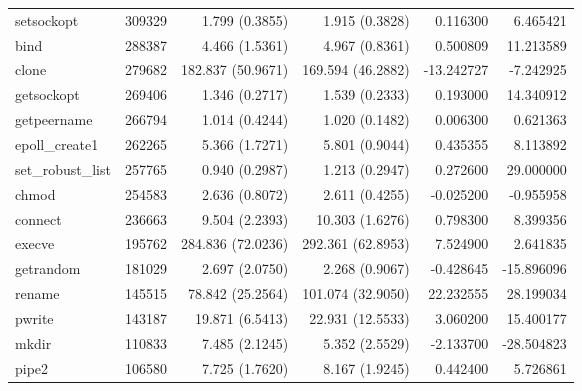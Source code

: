 \begin{longtable}{>{\ttfamily}lrrrrr}
                     setsockopt &      309329 &           1.799 (0.3855) &           1.915 (0.3828) &        0.116300 &     6.465421 \\
                           bind &      288387 &           4.466 (1.5361) &           4.967 (0.8361) &        0.500809 &    11.213589 \\
                          clone &      279682 &        182.837 (50.9671) &        169.594 (46.2882) &      -13.242727 &    -7.242925 \\
                     getsockopt &      269406 &           1.346 (0.2717) &           1.539 (0.2333) &        0.193000 &    14.340912 \\
                    getpeername &      266794 &           1.014 (0.4244) &           1.020 (0.1482) &        0.006300 &     0.621363 \\
                 epoll\_create1 &      262265 &           5.366 (1.7271) &           5.801 (0.9044) &        0.435355 &     8.113892 \\
              set\_robust\_list &      257765 &           0.940 (0.2987) &           1.213 (0.2947) &        0.272600 &    29.000000 \\
                          chmod &      254583 &           2.636 (0.8072) &           2.611 (0.4255) &       -0.025200 &    -0.955958 \\
                        connect &      236663 &           9.504 (2.2393) &          10.303 (1.6276) &        0.798300 &     8.399356 \\
                         execve &      195762 &        284.836 (72.0236) &        292.361 (62.8953) &        7.524900 &     2.641835 \\
                      getrandom &      181029 &           2.697 (2.0750) &           2.268 (0.9067) &       -0.428645 &   -15.896096 \\
                         rename &      145515 &         78.842 (25.2564) &        101.074 (32.9050) &       22.232555 &    28.199034 \\
                         pwrite &      143187 &          19.871 (6.5413) &         22.931 (12.5533) &        3.060200 &    15.400177 \\
                          mkdir &      110833 &           7.485 (2.1245) &           5.352 (2.5529) &       -2.133700 &   -28.504823 \\
                          pipe2 &      106580 &           7.725 (1.7620) &           8.167 (1.9245) &        0.442400 &     5.726861 \\

\end{longtable}
